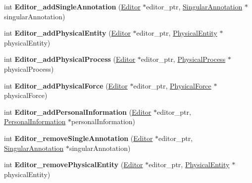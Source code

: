 \begin{DoxyCompactItemize}
\item 
\mbox{\label{namespaceomexmeta_a5eb4a4857c135a1aa5bd5c0a7eff6432}} 
int {\bfseries Editor\+\_\+add\+Single\+Annotation} (\hyperlink{classomexmeta_1_1Editor}{Editor} $\ast$editor\+\_\+ptr, \hyperlink{classomexmeta_1_1Triple}{Singular\+Annotation} $\ast$singular\+Annotation)
\item 
\mbox{\label{namespaceomexmeta_ac76722abeb1ceac922b1493a65c8de1c}} 
int {\bfseries Editor\+\_\+add\+Physical\+Entity} (\hyperlink{classomexmeta_1_1Editor}{Editor} $\ast$editor\+\_\+ptr, \hyperlink{classomexmeta_1_1PhysicalEntity}{Physical\+Entity} $\ast$physical\+Entity)
\item 
\mbox{\label{namespaceomexmeta_a26a63ff240f5400dc1f05c2c449f6e51}} 
int {\bfseries Editor\+\_\+add\+Physical\+Process} (\hyperlink{classomexmeta_1_1Editor}{Editor} $\ast$editor\+\_\+ptr, \hyperlink{classomexmeta_1_1PhysicalProcess}{Physical\+Process} $\ast$physical\+Process)
\item 
\mbox{\label{namespaceomexmeta_a25c470e9dd1cd508e103c687d08fea07}} 
int {\bfseries Editor\+\_\+add\+Physical\+Force} (\hyperlink{classomexmeta_1_1Editor}{Editor} $\ast$editor\+\_\+ptr, \hyperlink{classomexmeta_1_1PhysicalForce}{Physical\+Force} $\ast$physical\+Force)
\item 
\mbox{\label{namespaceomexmeta_a5da4e46f21b19e38fad07c06ad668efd}} 
int {\bfseries Editor\+\_\+add\+Personal\+Information} (\hyperlink{classomexmeta_1_1Editor}{Editor} $\ast$editor\+\_\+ptr, \hyperlink{classomexmeta_1_1PersonalInformation}{Personal\+Information} $\ast$personal\+Information)
\item 
\mbox{\label{namespaceomexmeta_a9cd0c78c5bf996caa79555b81bbfef1b}} 
int {\bfseries Editor\+\_\+remove\+Single\+Annotation} (\hyperlink{classomexmeta_1_1Editor}{Editor} $\ast$editor\+\_\+ptr, \hyperlink{classomexmeta_1_1Triple}{Singular\+Annotation} $\ast$singular\+Annotation)
\item 
\mbox{\label{namespaceomexmeta_ad83a65f14c1035b46cd81f0a963da6e4}} 
int {\bfseries Editor\+\_\+remove\+Physical\+Entity} (\hyperlink{classomexmeta_1_1Editor}{Editor} $\ast$editor\+\_\+ptr, \hyperlink{classomexmeta_1_1PhysicalEntity}{Physical\+Entity} $\ast$physical\+Entity)

\end{DoxyCompactItemize}
